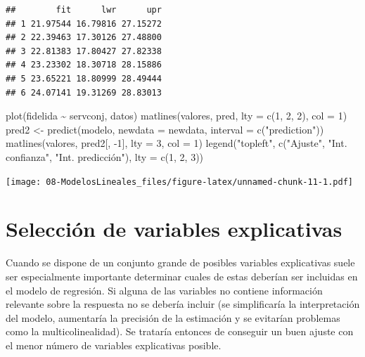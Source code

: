 \documentclass[
]{book}
\newenvironment{Shaded}{\begin{snugshade}}{\end{snugshade}}
\newcommand{\AttributeTok}[1]{\textcolor[rgb]{0.77,0.63,0.00}{#1}}
\newcommand{\DecValTok}[1]{\textcolor[rgb]{0.00,0.00,0.81}{#1}}
\newcommand{\FunctionTok}[1]{\textcolor[rgb]{0.00,0.00,0.00}{#1}}
\newcommand{\NormalTok}[1]{#1}
\newcommand{\OtherTok}[1]{\textcolor[rgb]{0.56,0.35,0.01}{#1}}
\newcommand{\SpecialCharTok}[1]{\textcolor[rgb]{0.00,0.00,0.00}{#1}}
\newcommand{\StringTok}[1]{\textcolor[rgb]{0.31,0.60,0.02}{#1}}
\theoremstyle{break}
\theoremstyle{nonumberplain}
\begin{document}
\begin{verbatim}
##        fit      lwr      upr
## 1 21.97544 16.79816 27.15272
## 2 22.39463 17.30126 27.48800
## 3 22.81383 17.80427 27.82338
## 4 23.23302 18.30718 28.15886
## 5 23.65221 18.80999 28.49444
## 6 24.07141 19.31269 28.83013
\end{verbatim}

\begin{Shaded}
\begin{Highlighting}[]
\FunctionTok{plot}\NormalTok{(fidelida }\SpecialCharTok{\textasciitilde{}}\NormalTok{ servconj, datos)}
\FunctionTok{matlines}\NormalTok{(valores, pred, }\AttributeTok{lty =} \FunctionTok{c}\NormalTok{(}\DecValTok{1}\NormalTok{, }\DecValTok{2}\NormalTok{, }\DecValTok{2}\NormalTok{), }\AttributeTok{col =} \DecValTok{1}\NormalTok{)}
\NormalTok{pred2 }\OtherTok{\textless{}{-}} \FunctionTok{predict}\NormalTok{(modelo, }\AttributeTok{newdata =}\NormalTok{ newdata, }\AttributeTok{interval =} \FunctionTok{c}\NormalTok{(}\StringTok{"prediction"}\NormalTok{))}
\FunctionTok{matlines}\NormalTok{(valores, pred2[, }\SpecialCharTok{{-}}\DecValTok{1}\NormalTok{], }\AttributeTok{lty =} \DecValTok{3}\NormalTok{, }\AttributeTok{col =} \DecValTok{1}\NormalTok{)}
\FunctionTok{legend}\NormalTok{(}\StringTok{"topleft"}\NormalTok{, }\FunctionTok{c}\NormalTok{(}\StringTok{"Ajuste"}\NormalTok{, }\StringTok{"Int. confianza"}\NormalTok{, }\StringTok{"Int. predicción"}\NormalTok{), }\AttributeTok{lty =} \FunctionTok{c}\NormalTok{(}\DecValTok{1}\NormalTok{, }\DecValTok{2}\NormalTok{, }\DecValTok{3}\NormalTok{))}
\end{Highlighting}
\end{Shaded}

\texttt{[image: 08-ModelosLineales\_files/figure-latex/unnamed-chunk-11-1.pdf]}

\hypertarget{selecciuxf3n-de-variables-explicativas}{%
\section{Selección de variables explicativas}\label{selecciuxf3n-de-variables-explicativas}}

Cuando se dispone de un conjunto grande de posibles variables explicativas
suele ser especialmente importante determinar cuales de estas deberían ser
incluidas en el modelo de regresión.
Si alguna de las variables no contiene información relevante sobre la respuesta
no se debería incluir (se simplificaría la interpretación del modelo, aumentaría
la precisión de la estimación y se evitarían problemas como la multicolinealidad).
Se trataría entonces de conseguir un buen ajuste con el menor número de variables explicativas posible.
\end{document}
